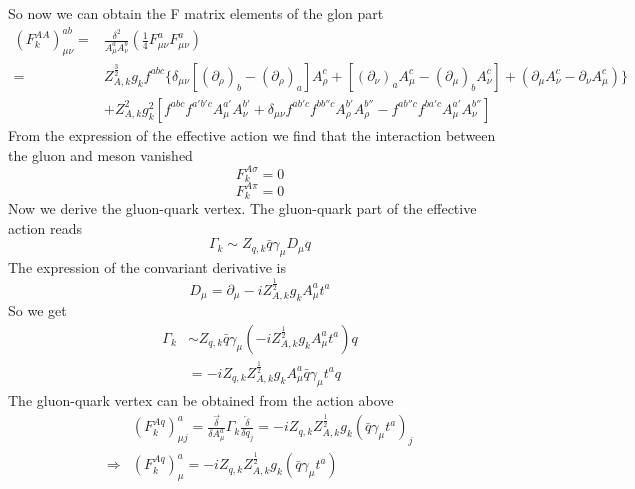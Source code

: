 \documentclass[UTF8]{article}
\begin{document}
So now we can obtain the F matrix elements of the glon part
\begin{equation}
\begin{split}
	(F^{AA}_k)^{ab}_{\mu\nu}=&\frac{\delta^2}{A^a_\mu A^b_\nu}(\frac{1}{4}F^a_{\mu\nu}F^a_{\mu\nu} )\\=&Z^{\frac{3}{2}}_{A,k}g_k f^{abc}\bigg\{\delta_{\mu\nu}[(\partial_\rho)_b-(\partial_\rho)_a]A^c_\rho+[(\partial_\nu)_a A^c_\mu-(\partial_\mu)_b A^c_\nu]+(\partial_\mu A^c_\nu-\partial_\nu A^c_\mu)\bigg\}\\&+Z^2_{A,k}
g^2_k [f^{abc}f^{a'b'c}A^{a'}_\mu A^{b'}_\nu+\delta_{\mu\nu}f^{ab'c}f^{bb''c}A^{b'}_\rho A^{b''}_\rho-f^{ab''c}f^{ba'c}A^{a'}_\mu A^{b''}_\nu]
\end{split}
\end{equation}
From the expression of the effective action we find that the interaction between the gluon and meson vanished
\begin{equation}
F^{A\sigma}_k=0
\end{equation}
\begin{equation}
F^{A\pi}_k=0
\end{equation}
Now we derive the gluon-quark vertex. The gluon-quark part of the effective action reads
\begin{equation}
	\Gamma_k\sim Z_{q,k}\bar{q}\gamma_\mu D_\mu q
\end{equation}
The expression of the convariant derivative is
\begin{equation}
	D_\mu=\partial_\mu -iZ^{\frac{1}{2}}_{A,k}g_k A^a_\mu t^a
\end{equation}
So we get
\begin{equation}
\begin{split}
	\Gamma_k&\sim Z_{q,k}\bar{q}\gamma_\mu (-iZ^{\frac{1}{2}}_{A,k}g_k A^a_\mu t^a)q\\
	&=-iZ_{q,k}Z^{\frac{1}{2}}_{A,k}g_k A^a_\mu \bar{q}\gamma_\mu t^a q
\end{split}
\end{equation}
The gluon-quark vertex can be obtained from the action above
\begin{equation}
\begin{split}
	&(F^{Aq}_k)^a_{\mu j}=\frac{\overrightarrow{\delta}}{\delta A^a_\mu}\Gamma_k \frac{\overleftarrow{\delta}}{\delta q_j}=-iZ_{q,k}Z^{\frac{1}{2}}_{A,k}g_k (\bar{q}\gamma_\mu t^a)_j\\
	\Longrightarrow& (F^{Aq}_k)^a_\mu=-iZ_{q,k}Z^{\frac{1}{2}}_{A,k}g_k(\bar{q}\gamma_\mu t^a)
\end{split}
\end{equation}
\end{document}
